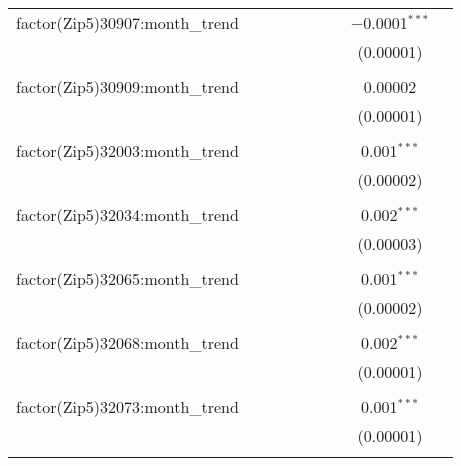 \begin{table}[H]
{\begin{tabular}{@{\extracolsep{5pt}}lcccccccc}
  factor(Zip5)30907:month\_trend &  &  &  &  &  &  & $-$0.0001$^{***}$ &  \\  

   &  &  &  &  &  &  & (0.00001) &  \\  

   & & & & & & & & \\  

  factor(Zip5)30909:month\_trend &  &  &  &  &  &  & 0.00002 &  \\  

   &  &  &  &  &  &  & (0.00001) &  \\  

   & & & & & & & & \\  

  factor(Zip5)32003:month\_trend &  &  &  &  &  &  & 0.001$^{***}$ &  \\  

   &  &  &  &  &  &  & (0.00002) &  \\  

   & & & & & & & & \\  

  factor(Zip5)32034:month\_trend &  &  &  &  &  &  & 0.002$^{***}$ &  \\  

   &  &  &  &  &  &  & (0.00003) &  \\  

   & & & & & & & & \\  

  factor(Zip5)32065:month\_trend &  &  &  &  &  &  & 0.001$^{***}$ &  \\  

   &  &  &  &  &  &  & (0.00002) &  \\  

   & & & & & & & & \\  

  factor(Zip5)32068:month\_trend &  &  &  &  &  &  & 0.002$^{***}$ &  \\  

   &  &  &  &  &  &  & (0.00001) &  \\  

   & & & & & & & & \\  

  factor(Zip5)32073:month\_trend &  &  &  &  &  &  & 0.001$^{***}$ &  \\  

   &  &  &  &  &  &  & (0.00001) &  \\  

   & & & & & & & & \\  


\end{tabular}}
\end{table}
